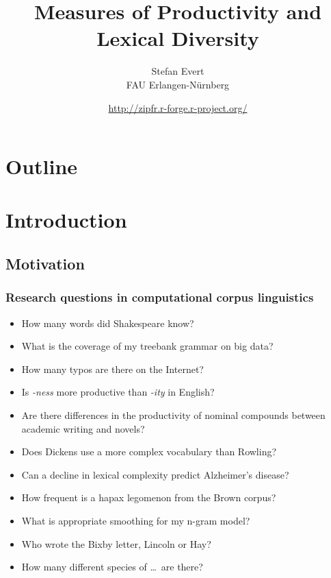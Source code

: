 \documentclass[t]{beamer} %
\title[JAECS 2018]{Measures of Productivity and Lexical Diversity}
\subtitle{\primary{7 October 2018}}
\author[Stefan Evert]{Stefan Evert\\ FAU Erlangen-Nürnberg}
\date[7 Oct 2018 | CC-by-sa]{\href{http://zipfr.r-forge.r-project.org/}{http://zipfr.r-forge.r-project.org/}\\
 \light{\small Licensed under CC-by-sa version 3.0}}
\begin{document}

\frame{\titlepage}
\hideLogo{}


\section*{Outline}

\section{Introduction}

\subsection{Motivation}

\begin{frame}
  \frametitle{Research questions in computational corpus linguistics}

  \begin{itemize}
  \item How many words did Shakespeare know?
  \item What is the coverage of my treebank grammar on big data?
  \item How many typos are there on the Internet?
  \item Is \emph{-ness} more productive than \emph{-ity} in English?
  \item Are there differences in the productivity of nominal compounds between academic writing and novels?
  \item Does Dickens use a more complex vocabulary than Rowling?
  \item Can a decline in lexical complexity predict Alzheimer's disease?
  \item How frequent is a hapax legomenon from the Brown corpus?
  \item What is appropriate smoothing for my n-gram model?
  \item Who wrote the Bixby letter, Lincoln or Hay?
  \item How many different species of \ldots\ are there? \citep{Brainerd:82}
  \end{itemize}
\end{frame}
\end{document}
